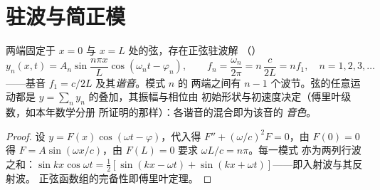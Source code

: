 \section{驻波与简正模}

\begin{proposition}[两端固定弦的简正模]\label{prop:b2:waves-on-strings:modes}
两端固定于 $x = 0$ 与 $x = L$ 处的弦，存在正弦驻波解
（\emph{}）
\[
y_n(x, t) = A_n\sin\frac{n\pi x}{L}\cos(\omega_nt - \varphi_n) , \qquad
f_n = \frac{\omega_n}{2\pi} = n\,\frac{c}{2L} = n f_1 , \quad n = 1, 2, 3, \dots
\]
——基音 $f_1 = c/2L$ 及其\emph{谐音}。模式 $n$ 的
两端之间有 $n - 1$ 个波节。弦的任意运动都是
$y = \sum_ny_n$ 的叠加，其振幅与相位由
初始形状与初速度决定（傅里叶级数，如本年数学分册
所证明的那样）：各谐音的混合即为该音的
\emph{音色}。
\end{proposition}

\begin{proof}
设 $y = F(x)\cos(\omega t - \varphi)$，代入得 $F'' + (\omega/c)^2F = 0$，由 $F(0) = 0$ 得
$F = A\sin(\omega x/c)$，由 $F(L) = 0$ 要求 $\omega L/c = n\pi$。每一模式
亦为两列行波之和：$\sin kx\cos\omega t = \tfrac12[\sin(kx -
\omega t) + \sin(kx + \omega t)]$——即入射波与其反射波。
正弦函数组的完备性即傅里叶定理。
\end{proof}

